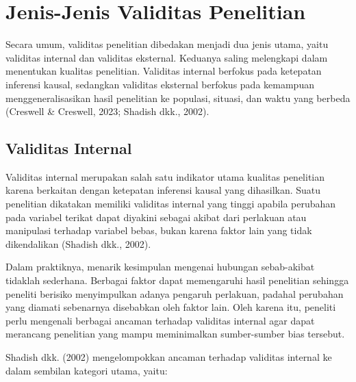 \documentclass[
  indonesian,
  letterpaper,
  DIV=11,
  numbers=noendperiod]{scrreprt}
\begin{document}
\section{Jenis-Jenis Validitas
Penelitian}\label{jenis-jenis-validitas-penelitian}

Secara umum, validitas penelitian dibedakan menjadi dua jenis utama,
yaitu validitas internal dan validitas eksternal. Keduanya saling
melengkapi dalam menentukan kualitas penelitian. Validitas internal
berfokus pada ketepatan inferensi kausal, sedangkan validitas eksternal
berfokus pada kemampuan menggeneralisasikan hasil penelitian ke
populasi, situasi, dan waktu yang berbeda (Creswell \& Creswell, 2023;
Shadish dkk., 2002).

\subsection{Validitas Internal}\label{validitas-internal}

Validitas internal merupakan salah satu indikator utama kualitas
penelitian karena berkaitan dengan ketepatan inferensi kausal yang
dihasilkan. Suatu penelitian dikatakan memiliki validitas internal yang
tinggi apabila perubahan pada variabel terikat dapat diyakini sebagai
akibat dari perlakuan atau manipulasi terhadap variabel bebas, bukan
karena faktor lain yang tidak dikendalikan (Shadish dkk., 2002).

Dalam praktiknya, menarik kesimpulan mengenai hubungan sebab-akibat
tidaklah sederhana. Berbagai faktor dapat memengaruhi hasil penelitian
sehingga peneliti berisiko menyimpulkan adanya pengaruh perlakuan,
padahal perubahan yang diamati sebenarnya disebabkan oleh faktor lain.
Oleh karena itu, peneliti perlu mengenali berbagai ancaman terhadap
validitas internal agar dapat merancang penelitian yang mampu
meminimalkan sumber-sumber bias tersebut.

Shadish dkk. (2002) mengelompokkan ancaman terhadap validitas internal
ke dalam sembilan kategori utama, yaitu:
\end{document}
